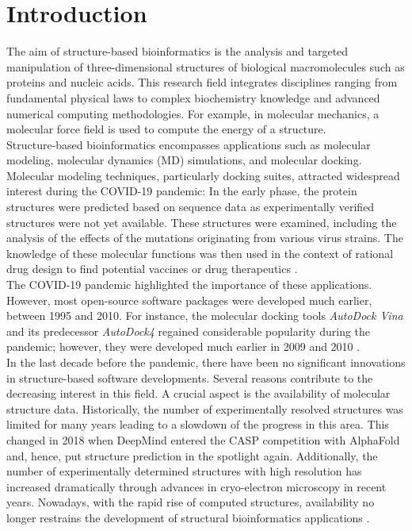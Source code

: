 \section{Introduction}


The aim of structure-based bioinformatics is the analysis and targeted manipulation of three-dimensional structures of biological macromolecules such as proteins and nucleic acids. This research field integrates disciplines ranging from fundamental physical laws to complex biochemistry knowledge and advanced numerical computing methodologies. For example, in molecular mechanics, a molecular force field is used to compute the energy of a structure.  \\
Structure-based bioinformatics encompasses applications such as molecular modeling, molecular dynamics (MD) simulations, and molecular docking.  Molecular modeling techniques, particularly docking suites, attracted widespread interest during the COVID-19 pandemic: In the early phase, the protein structures were predicted based on sequence data as experimentally verified structures were not yet available. These structures were examined, including the analysis of the effects of the mutations originating from various virus strains. The knowledge of these molecular functions was then used in the context of rational drug design to find potential vaccines or drug therapeutics \cite{Kumar2021}. \\
The COVID-19 pandemic highlighted the importance of these applications. However, most open-source software packages were developed much earlier, between 1995 and 2010. For instance, the molecular docking tools \textit{AutoDock Vina} and its predecessor \textit{AutoDock4} regained considerable popularity during the pandemic; however, they were developed much earlier in 2009 and 2010 \cite{Trott2010, Morris2009AutoDock4AA}.\\
In the last decade before the pandemic, there have been no significant innovations in structure-based software developments. Several reasons contribute to the decreasing interest in this field. A crucial aspect is the availability of molecular structure data. Historically, the number of experimentally resolved structures was limited for many years \cite{berman2000protein} leading to a slowdown of the progress in this area. This changed in 2018 when DeepMind entered the CASP competition with AlphaFold \cite{deepmind} and, hence, put structure prediction in the spotlight again. Additionally, the number of experimentally determined structures with high resolution has increased dramatically through advances in cryo-electron microscopy in recent years. Nowadays, with the rapid rise of computed structures, availability no longer restrains the development of structural bioinformatics applications \cite{AlphaFoldDB2023}. \\


